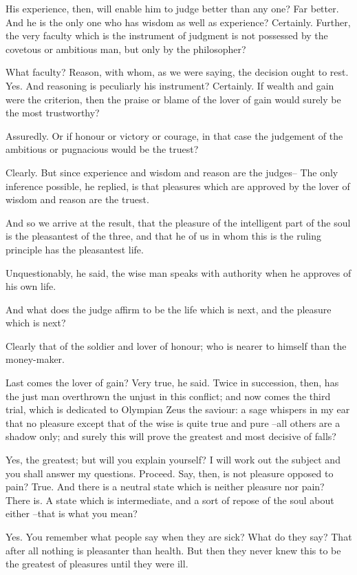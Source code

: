 His experience, then, will enable him to judge better than any one?
Far better.
And he is the only one who has wisdom as well as experience?
Certainly.
Further, the very faculty which is the instrument of judgment is not possessed by the covetous or ambitious man, but only by the philosopher?

What faculty?
Reason, with whom, as we were saying, the decision ought to rest.
Yes.
And reasoning is peculiarly his instrument?
Certainly.
If wealth and gain were the criterion, then the praise or blame of the lover of gain would surely be the most trustworthy?

Assuredly.
Or if honour or victory or courage, in that case the judgement of the ambitious or pugnacious would be the truest?

Clearly.
But since experience and wisdom and reason are the judges--
The only inference possible, he replied, is that pleasures which are approved by the lover of wisdom and reason are the truest.

And so we arrive at the result, that the pleasure of the intelligent part of the soul is the pleasantest of the three, and that he of us in whom this is the ruling principle has the pleasantest life.

Unquestionably, he said, the wise man speaks with authority when he approves of his own life.

And what does the judge affirm to be the life which is next, and the pleasure which is next?

Clearly that of the soldier and lover of honour; who is nearer to himself than the money-maker.

Last comes the lover of gain?
Very true, he said.
Twice in succession, then, has the just man overthrown the unjust in this conflict; and now comes the third trial, which is dedicated to Olympian Zeus the saviour: a sage whispers in my ear that no pleasure except that of the wise is quite true and pure --all others are a shadow only; and surely this will prove the greatest and most decisive of falls?

Yes, the greatest; but will you explain yourself?
I will work out the subject and you shall answer my questions.
Proceed.
Say, then, is not pleasure opposed to pain?
True.
And there is a neutral state which is neither pleasure nor pain?
There is.
A state which is intermediate, and a sort of repose of the soul about either --that is what you mean?

Yes.
You remember what people say when they are sick?
What do they say?
That after all nothing is pleasanter than health. But then they never knew this to be the greatest of pleasures until they were ill.

